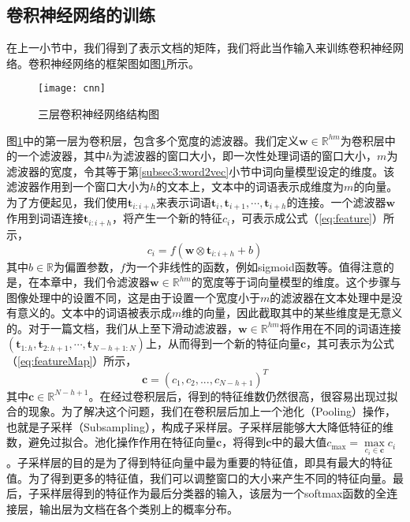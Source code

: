 \subsection{卷积神经网络的训练}
\label{subsec3:cnnTraining}
在上一小节中，我们得到了表示文档的矩阵，我们将此当作输入来训练卷积神经网络。卷积神经网络的框架图如图\ref{fig:cnn}所示。

\begin{figure}[!htbp]
  \centering
  \texttt{[image: cnn]}
  \caption{三层卷积神经网络结构图}
  \label{fig:cnn}
\end{figure}

图\ref{fig:cnn}中的第一层为卷积层，包含多个宽度的滤波器。我们定义$\mathbf{w} \in \mathbb{R}^{hm}$为卷积层中的一个滤波器，其中$h$为滤波器的窗口大小，即一次性处理词语的窗口大小，$m$为滤波器的宽度，令其等于第\ref{subsec3:word2vec}小节中词向量模型设定的维度。该滤波器作用到一个窗口大小为$h$的文本上，文本中的词语表示成维度为$m$的向量。为了方便起见，我们使用$\mathbf{t}_{i:i+h}$来表示词语$\mathbf{t}_i, \mathbf{t}_{i+1}, \cdots, \mathbf{t}_{i+h}$的连接。一个滤波器$\mathbf{w}$作用到词语连接$\mathbf{t}_{i:i+h}$，将产生一个新的特征$c_i$，可表示成公式（\ref{eq:feature}）所示，
\begin{equation}
\label{eq:feature}
	c_i=f(\mathbf{w} \otimes \mathbf{t}_{i:i+h} + b)
\end{equation}
其中$b \in \mathbb{R}$为偏置参数，$f$为一个非线性的函数，例如sigmoid函数等。值得注意的是，在本章中，我们令滤波器$\mathbf{w} \in \mathbb{R}^{hm}$的宽度等于词向量模型的维度。这个步骤与图像处理中的设置不同，这是由于设置一个宽度小于$m$的滤波器在文本处理中是没有意义的。文本中的词语被表示成$m$维的向量，因此截取其中的某些维度是无意义的。对于一篇文档，我们从上至下滑动滤波器，$\mathbf{w} \in \mathbb{R}^{hm}$将作用在不同的词语连接$(\mathbf{t}_{1:h}, \mathbf{t}_{2:h + 1}, \cdots, \mathbf{t}_{N - h + 1:N})$上，从而得到一个新的特征向量$\mathbf{c}$，其可表示为公式（\ref{eq:featureMap}）所示，
\begin{equation}
\label{eq:featureMap}
	\mathbf{c}  = ({c_1},{c_2},...,{c_{N - h + 1}})^T
\end{equation}
其中$\mathbf{c} \in \mathbb{R}^{N-h+1}$。在经过卷积层后，得到的特征维数仍然很高，很容易出现过拟合的现象。为了解决这个问题，我们在卷积层后加上一个池化（Pooling）操作，也就是子采样（Subsampling），构成子采样层。子采样层能够大大降低特征的维数，避免过拟合。池化操作作用在特征向量$\mathbf{c}$，将得到$\mathbf{c}$中的最大值$c_{\max} = \max\limits_{c_i \in \mathbf{c}} c_i$。子采样层的目的是为了得到特征向量中最为重要的特征值，即具有最大的特征值。为了得到更多的特征值，我们可以调整窗口的大小来产生不同的特征向量。最后，子采样层得到的特征作为最后分类器的输入，该层为一个softmax函数的全连接层，输出层为文档在各个类别上的概率分布。

